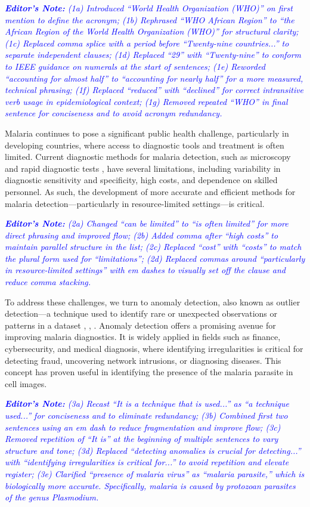\documentclass[journal,12pt,onecolumn,draftcls]{IEEEtran}
\newcommand{\editornote}[1]{\par\textit{\textcolor{blue}{\textbf{Editor's Note:} #1}}\par}
\begin{document}
\editornote{(1a) Introduced “World Health Organization (WHO)” on first mention to define the acronym; 
(1b) Rephrased “WHO African Region” to “the African Region of the World Health Organization (WHO)” for structural clarity; 
(1c) Replaced comma splice with a period before “Twenty-nine countries...” to separate independent clauses; 
(1d) Replaced “29” with “Twenty-nine” to conform to IEEE guidance on numerals at the start of sentences; 
(1e) Reworded “accounting for almost half” to “accounting for nearly half” for a more measured, technical phrasing; 
(1f) Replaced “reduced” with “declined” for correct intransitive verb usage in epidemiological context; 
(1g) Removed repeated “WHO” in final sentence for conciseness and to avoid acronym redundancy.}

Malaria continues to pose a significant public health challenge, particularly in developing countries, where access to diagnostic tools and treatment is often limited. Current diagnostic methods for malaria detection, such as microscopy and rapid diagnostic tests \cite{wilson2012}, have several limitations, including variability in diagnostic sensitivity and specificity, high costs, and dependence on skilled personnel. As such, the development of more accurate and efficient methods for malaria detection—particularly in resource-limited settings—is critical.

\editornote{(2a) Changed “can be limited” to “is often limited” for more direct phrasing and improved flow; 
(2b) Added comma after “high costs” to maintain parallel structure in the list; 
(2c) Replaced “cost” with “costs” to match the plural form used for “limitations”; 
(2d) Replaced commas around “particularly in resource-limited settings” with em dashes to visually set off the clause and reduce comma stacking.}

To address these challenges, we turn to anomaly detection, also known as outlier detection—a technique used to identify rare or unexpected observations or patterns in a dataset \cite{chandola2009}, \cite{ruff2021}, \cite{edgeworth1887}. Anomaly detection offers a promising avenue for improving malaria diagnostics. It is widely applied in fields such as finance, cybersecurity, and medical diagnosis, where identifying irregularities is critical for detecting fraud, uncovering network intrusions, or diagnosing diseases. This concept has proven useful in identifying the presence of the malaria parasite in cell images.

\editornote{(3a) Recast “It is a technique that is used...” as “a technique used...” for conciseness and to eliminate redundancy; 
(3b) Combined first two sentences using an em dash to reduce fragmentation and improve flow; 
(3c) Removed repetition of “It is” at the beginning of multiple sentences to vary structure and tone; 
(3d) Replaced “detecting anomalies is crucial for detecting...” with “identifying irregularities is critical for...” to avoid repetition and elevate register; 
(3e) Clarified “presence of malaria virus” as “malaria parasite,” which is biologically more accurate. Specifically, malaria is caused by protozoan parasites of the genus Plasmodium.}
\end{document}
